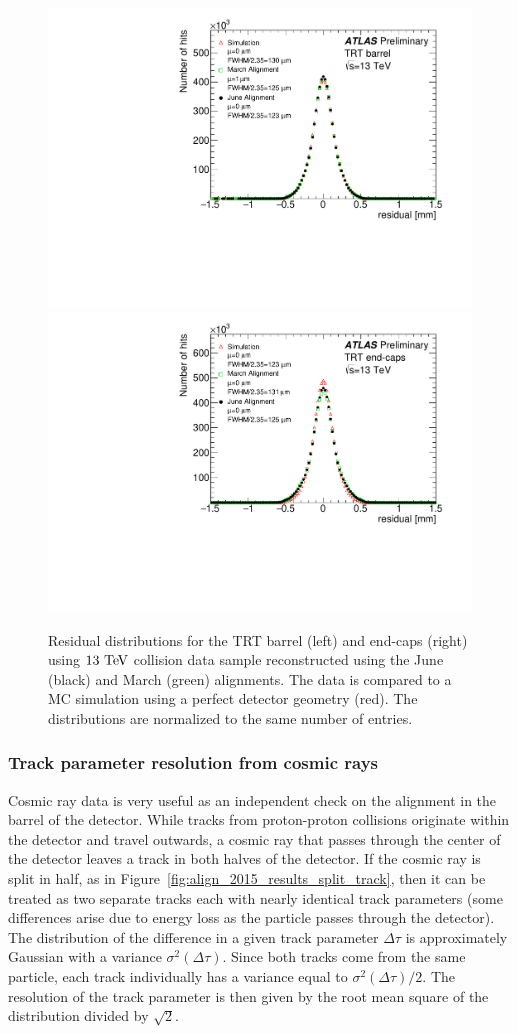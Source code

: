 \begin{figure}[htbp]
  \centering
  \includegraphics[width=.48\textwidth]{figs/alignment/align2015/TRTR}
  \includegraphics[width=.48\textwidth]{figs/alignment/align2015/TRTEC}
  \caption{Residual distributions for the TRT barrel (left) and end-caps (right) using $13\tev$ collision data sample reconstructed using the June (black) and March (green) alignments.  The data is compared to a MC simulation using a perfect detector geometry (red).  The distributions are normalized to the same number of entries.}
  \label{fig:align_2015_results_trt}
\end{figure}
\FloatBarrier

\subsubsection{Track parameter resolution from cosmic rays}\label{align:2015_results_cosmic}
Cosmic ray data is very useful as an independent check on the alignment in the barrel of the detector.
While tracks from proton-proton collisions originate within the detector and travel outwards, a cosmic ray that passes through the center of the detector leaves a track in both halves of the detector.
If the cosmic ray is split in half, as in Figure~\ref{fig:align_2015_results_split_track}, then it can be treated as two separate tracks each with nearly identical track parameters (some differences arise due to energy loss as the particle passes through the detector).
The distribution of the difference in a given track parameter $\Delta\tau$ is approximately Gaussian with a variance $\sigma^2(\Delta\tau)$.
Since both tracks come from the same particle, each track individually has a variance equal to $\sigma^2(\Delta\tau)/2$.
The resolution of the track parameter is then given by the root mean square of the distribution divided by $\sqrt{2}$.


